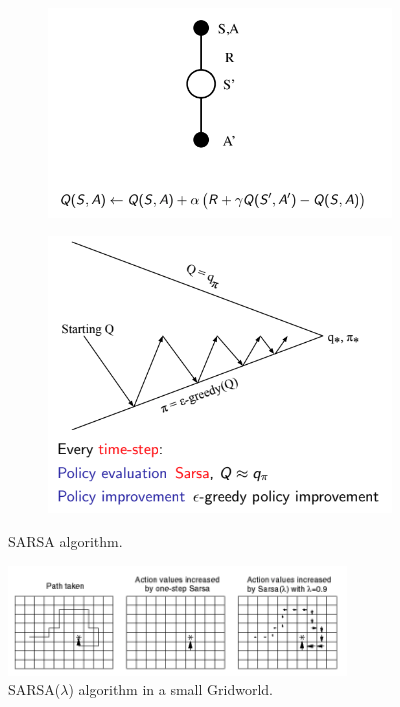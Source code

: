 \documentclass[11pt]{book} %
\begin{document}
\begin{figure}[ht]
    \begin{subfigure}[b]{0.5\textwidth}
        \centering
        \includegraphics[width=\textwidth]{./Figs/SARSA.png }
        \label{fig:SARSA}
    \end{subfigure}
    \begin{subfigure}[b]{0.5\textwidth}
        \centering
        \includegraphics[width=\textwidth]{./Figs/SARSA2.png}
        \label{fig:SARSA_tree}
    \end{subfigure}
    \label{fig:SARSA}
    \caption{SARSA algorithm.}
\end{figure}

\begin{figure}[ht]
    \centering
    \includegraphics[width=0.8\textwidth]{./Figs/SARSA_grid.png}
    \caption{SARSA($\lambda$) algorithm in a small Gridworld.}
    \label{fig:SARSA}
\end{figure}
\end{document}
